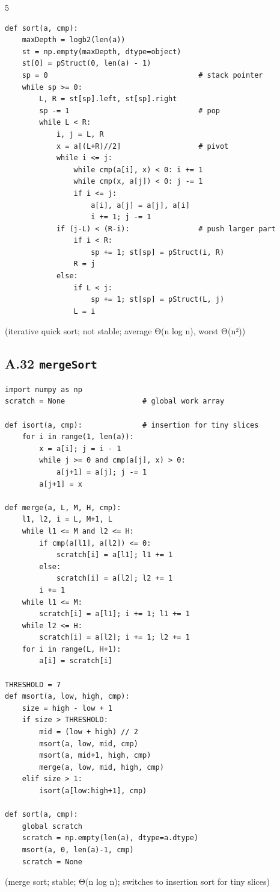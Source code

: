 \documentclass[6pt,landscape]{article}
\begin{document}
\begin{multicols}{5}
\begin{verbatim}
def sort(a, cmp):
    maxDepth = logb2(len(a))
    st = np.empty(maxDepth, dtype=object)
    st[0] = pStruct(0, len(a) - 1)
    sp = 0                                   # stack pointer
    while sp >= 0:
        L, R = st[sp].left, st[sp].right
        sp -= 1                              # pop
        while L < R:
            i, j = L, R
            x = a[(L+R)//2]                  # pivot
            while i <= j:
                while cmp(a[i], x) < 0: i += 1
                while cmp(x, a[j]) < 0: j -= 1
                if i <= j:
                    a[i], a[j] = a[j], a[i]
                    i += 1; j -= 1
            if (j-L) < (R-i):                # push larger part
                if i < R:
                    sp += 1; st[sp] = pStruct(i, R)
                R = j
            else:
                if L < j:
                    sp += 1; st[sp] = pStruct(L, j)
                L = i
\end{verbatim}
(iterative quick sort; not stable; average Θ(n log n), worst Θ(n²))

\subsection{A.32 \texttt{mergeSort}}\label{code:A32}
\begin{verbatim}
import numpy as np
scratch = None                  # global work array

def isort(a, cmp):              # insertion for tiny slices
    for i in range(1, len(a)):
        x = a[i]; j = i - 1
        while j >= 0 and cmp(a[j], x) > 0:
            a[j+1] = a[j]; j -= 1
        a[j+1] = x

def merge(a, L, M, H, cmp):
    l1, l2, i = L, M+1, L
    while l1 <= M and l2 <= H:
        if cmp(a[l1], a[l2]) <= 0:
            scratch[i] = a[l1]; l1 += 1
        else:
            scratch[i] = a[l2]; l2 += 1
        i += 1
    while l1 <= M:
        scratch[i] = a[l1]; i += 1; l1 += 1
    while l2 <= H:
        scratch[i] = a[l2]; i += 1; l2 += 1
    for i in range(L, H+1):
        a[i] = scratch[i]

THRESHOLD = 7
def msort(a, low, high, cmp):
    size = high - low + 1
    if size > THRESHOLD:
        mid = (low + high) // 2
        msort(a, low, mid, cmp)
        msort(a, mid+1, high, cmp)
        merge(a, low, mid, high, cmp)
    elif size > 1:
        isort(a[low:high+1], cmp)

def sort(a, cmp):
    global scratch
    scratch = np.empty(len(a), dtype=a.dtype)
    msort(a, 0, len(a)-1, cmp)
    scratch = None
\end{verbatim}
(merge sort; stable; Θ(n log n); switches to insertion sort for tiny slices)
\end{multicols}
\end{document}
